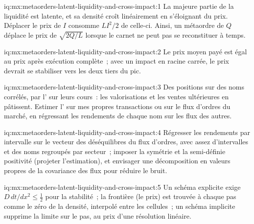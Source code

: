 \begin{solution}{iq:mx:metaorders-latent-liquidity-and-cross-impact:1}
La majeure partie de la liquidité est latente, et sa densité croît linéairement en s'éloignant du prix. Déplacer le prix de $I$ consomme $LI^2/2$ de celle-ci. Ainsi, un métaordre de $Q$
déplace le prix de $\sqrt{2Q/L}$ lorsque le carnet ne peut pas se reconstituer à temps.
\end{solution}

\begin{solution}{iq:mx:metaorders-latent-liquidity-and-cross-impact:2}
Le prix moyen payé est égal au prix après exécution complète~; avec un impact en racine carrée, le prix devrait se stabiliser vers les deux tiers du pic.
\end{solution}

\begin{solution}{iq:mx:metaorders-latent-liquidity-and-cross-impact:3}
Des positions sur des noms corrélés, par l' sur leurs cours~: les valorisations et les ventes ultérieures en pâtissent. Estimer l' sur mes propres transactions ou sur le flux d'ordres du marché,
en régressant les rendements de chaque nom sur les flux des autres.
\end{solution}

\begin{solution}{iq:mx:metaorders-latent-liquidity-and-cross-impact:4}
Régresser les rendements par intervalle sur le vecteur des déséquilibres du flux d'ordres, avec assez d'intervalles et des noms regroupés par secteur~; imposer la symétrie et la semi-définie positivité
(projeter l'estimation), et envisager une décomposition en valeurs propres de la covariance des flux pour réduire le bruit.
\end{solution}

\begin{solution}{iq:mx:metaorders-latent-liquidity-and-cross-impact:5}
Un schéma explicite exige $D\,dt/dx^2\le\tfrac12$ pour la stabilité~; la frontière (le prix) est trouvée à chaque pas comme le zéro de la densité, interpolé
entre les cellules~; un schéma implicite supprime la limite sur le pas, au prix d'une résolution linéaire.
\end{solution}

